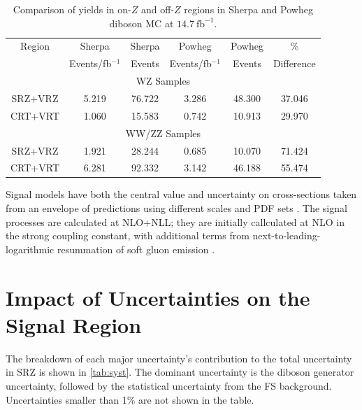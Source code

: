 \begin{table}
\begin{center}
\begin{tabular}{c|c|c|c|c|c} \\
Region & Sherpa & Sherpa & Powheg & Powheg & \% \\
& Events/fb$^{-1}$ & Events & Events/fb$^{-1}$ & Events & Difference \\
\hline
\hline
\multicolumn{6}{c}{WZ Samples} \\
\hline
SRZ+VRZ & 5.219 & 76.722 & 3.286 & 48.300 & 37.046 \\
CRT+VRT & 1.060 & 15.583 & 0.742 & 10.913 & 29.970 \\
\hline
\multicolumn{6}{c}{WW/ZZ Samples} \\
\hline
SRZ+VRZ & 1.921 & 28.244 & 0.685 & 10.070 & 71.424 \\
CRT+VRT & 6.281 & 92.332 & 3.142 & 46.188 & 55.474 \\
\hline
\end{tabular}
\end{center}
\caption{Comparison of yields in on-$Z$ and off-$Z$ regions in Sherpa and Powheg diboson MC at $14.7~\mathrm{fb}^{-1}$.}
\label{table:Diboson_powhegsherpa1}
\end{table}

Signal models have both the central value and uncertainty on cross-sections taken from an envelope of predictions using different scales and \ac{PDF} sets \cite{Kramer:2012bx}. The signal processes are calculated at \ac{NLO+NLL}; they are initially callculated at \ac{NLO} in the strong coupling constant, with additional terms from next-to-leading-logarithmic resummation of soft gluon emission \cite{Beenakker:1996ch,Kulesza:2008jb,Kulesza:2009kq,Beenakker:2009ha,Beenakker:2011fu}.



\section{Impact of Uncertainties on the Signal Region}


The breakdown of each major uncertainty's contribution to the total uncertainty in SRZ is shown in \autoref{tab:syst}. The dominant uncertainty is the diboson generator uncertainty, followed by the statistical uncertainty from the \ac{FS} background. Uncertainties smaller than 1\% are not shown in the table. 

